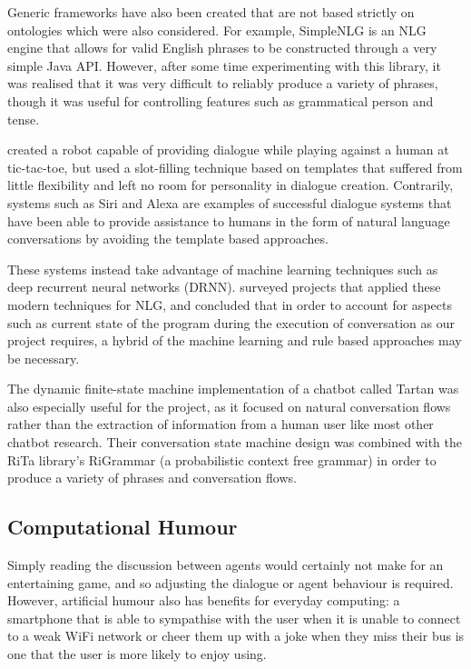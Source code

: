\documentclass[conference]{IEEEtran}
\begin{document}
Generic frameworks have also been created that are not based strictly on ontologies which were also considered. For example, SimpleNLG \cite{simplenlg} is an NLG engine that allows for valid English phrases to be constructed through a very simple Java API. However, after some time experimenting with this library, it was realised that it was very difficult to reliably produce a variety of phrases, though it was useful for controlling features such as grammatical person and tense.

\cite{robotgame} created a robot capable of providing dialogue while playing against a human at tic-tac-toe, but used a slot-filling technique based on templates that suffered from little flexibility and left no room for personality in dialogue creation. Contrarily, systems such as Siri and Alexa are examples of successful dialogue systems that have been able to provide assistance to humans in the form of natural language conversations by avoiding the template based approaches.

These systems instead take advantage of machine learning techniques such as deep recurrent neural networks (DRNN). \cite{dialoguesystems} surveyed projects that applied these modern techniques for NLG, and concluded that in order to account for aspects such as current state of the program during the execution of conversation as our project requires, a hybrid of the machine learning and rule based approaches may be necessary. 

The dynamic finite-state machine implementation of a chatbot called Tartan \cite{tartan} was also especially useful for the project, as it focused on natural conversation flows rather than the extraction of information from a human user like most other chatbot research. Their conversation state machine design was combined with the RiTa library's RiGrammar (a probabilistic context free grammar) in order to produce a variety of phrases and conversation flows. 

\subsection{Computational Humour}

Simply reading the discussion between agents would certainly not make for an entertaining game, and so adjusting the dialogue or agent behaviour is required. However, artificial humour also has benefits for everyday computing: a smartphone that is able to sympathise with the user when it is unable to connect to a weak WiFi network or cheer them up with a joke when they miss their bus is one that the user is more likely to enjoy using. 
\end{document}
